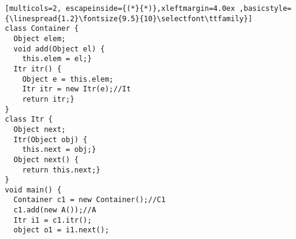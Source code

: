 

\begin{figure*}
\begin{center}
\centering
\begin{lstlisting}[multicols=2, escapeinside={(*}{*)},xleftmargin=4.0ex ,basicstyle={\linespread{1.2}\fontsize{9.5}{10}\selectfont\ttfamily}]
class Container {
  Object elem;
  void add(Object el) {
    this.elem = el;}
  Itr itr() {
    Object e = this.elem;
    Itr itr = new Itr(e);//It
    return itr;}
}
class Itr {
  Object next;
  Itr(Object obj) {
    this.next = obj;}
  Object next() {
    return this.next;}
}
void main() {
  Container c1 = new Container();//C1
  c1.add(new A());//A
  Itr i1 = c1.itr();
  object o1 = i1.next();
	

\end{lstlisting}
\end{center}
\end{figure*}
